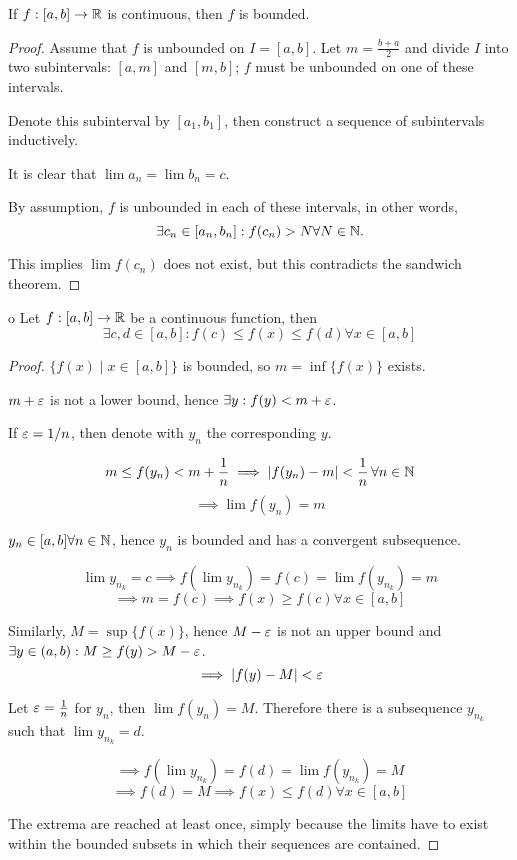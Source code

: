 \documentclass[a4paper,10pt]{article}
\begin{document}
\begin{thm}
	If $f:[a,b] \to \mathbb{R}$ is continuous, then $f$ is bounded.
\end{thm}

\begin{proof}
	Assume that $f$ is unbounded on $I = [a,b]$. Let $m = \frac{b+a}{2}$
	and divide $I$ into two subintervals: $[a,m]$ and $[m,b]$; $f$ must be
	unbounded on one of these intervals.

	Denote this subinterval by $[a_1, b_1]$, then construct a
	sequence of subintervals inductively.

	It is clear that $\lim a_n = \lim b_n = c$.

	By assumption, $f$ is unbounded in each of these intervals, in other words,
	\[ \exists c_n \in [a_n, b_n] : f(c_n) > N \forall N \in \mathbb{N}. \]

	This implies $\lim f(c_n)$ does not exist, but this contradicts
	the sandwich theorem.
\end{proof}

\begin{thm}o
	Let $f:[a,b] \to \mathbb{R}$ be a continuous function, then
	\[ \exists c,d \in [a,b] : f(c) \leq f(x) \leq f(d) \forall x \in [a,b] \]
\end{thm}

\begin{proof}
	$\{f(x) \mid x \in [a,b] \}$ is bounded, so $m = \inf \{f(x)\}$ exists.

	$m+\varepsilon$ is not a lower bound, hence $\exists y : f(y) < m+\varepsilon$.

	If $\varepsilon = 1/n$, then denote with $y_n$ the corresponding $y$.

	\[
		m \leq f(y_n) < m + \frac{1}{n}
		\implies |f(y_n) -m| < \frac{1}{n} \, \forall n \in \mathbb{N}
	\]
	\[ \implies \lim f(y_n) = m \]

	$y_n \in [a,b] \forall n \in \mathbb{N}$, hence $y_n$ is bounded and
	has a convergent subsequence.

	\[
		\lim y_{n_k} = c \implies f(\lim y_{n_k}) = f(c)
		= \lim f(y_{n_k}) = m
	\]
	\[ \implies m = f(c) \implies f(x) \geq f(c) \forall x \in [a,b] \]

	Similarly, $M = \sup \{f(x)\}$, hence $M-\varepsilon$ is not an upper bound and
	$\exists y \in (a,b) : M \geq f(y) > M-\varepsilon$.
	\[ \implies |f(y) - M| < \varepsilon \]

	Let $\varepsilon = \frac{1}{n}$ for $y_n$, then $\lim f(y_n) = M$.
	Therefore there is a subsequence $y_{n_k}$ such that $\lim y_{n_k} = d$.

	\[ \implies f(\lim y_{n_k}) = f(d) = \lim f(y_{n_k}) = M \]
	\[ \implies f(d) = M \implies f(x) \leq f(d) \forall x \in [a,b] \]

	The extrema are reached at least once, simply because the limits
	have to exist within the bounded subsets in which their
	sequences are contained.
\end{proof}
\end{document}
